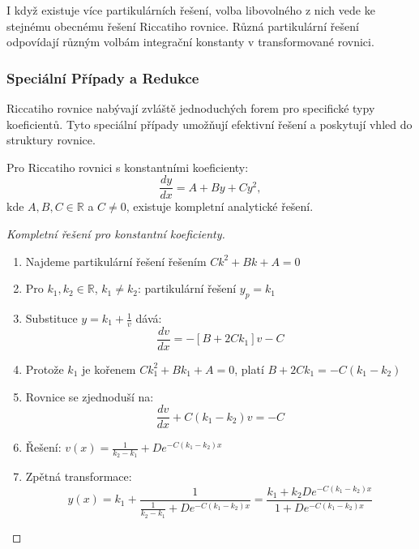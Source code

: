 \vspace{0.8\baselineskip}

\begin{remark}
\label{rem:volba-partikularniho}
I když existuje více partikulárních řešení, volba libovolného z nich vede ke stejnému 
obecnému řešení Riccatiho rovnice. Různá partikulární řešení odpovídají různým volbám 
integrační konstanty v transformované rovnici.
\end{remark}

\vspace{0.8\baselineskip}



\subsubsection{Speciální Případy a Redukce}
\label{subsubsec:specialni-pripady-riccati}

Riccatiho rovnice nabývají zvláště jednoduchých forem pro specifické typy koeficientů. Tyto speciální případy umožňují efektivní řešení a poskytují vhled do struktury rovnice.

\vspace{0.8\baselineskip}

\begin{method}
\label{met:l2-riccati-konstantni-koeficienty}
Pro Riccatiho rovnici s konstantními koeficienty:
\[
\frac{dy}{dx} = A + By + Cy^2,
\]
kde $A, B, C \in \mathbb{R}$ a $C \neq 0$, existuje kompletní analytické řešení.
\end{method}

\vspace{0.6\baselineskip}

\begin{proof}[Kompletní řešení pro konstantní koeficienty]
\begin{enumerate}
\item Najdeme partikulární řešení řešením $Ck^2 + Bk + A = 0$
\item Pro $k_1, k_2 \in \mathbb{R}$, $k_1 \neq k_2$: partikulární řešení $y_p = k_1$
\item Substituce $y = k_1 + \frac{1}{v}$ dává:
\[
\frac{dv}{dx} = -[B + 2Ck_1]v - C
\]
\item Protože $k_1$ je kořenem $Ck_1^2 + Bk_1 + A = 0$, platí $B + 2Ck_1 = -C(k_1 - k_2)$
\item Rovnice se zjednoduší na:
\[
\frac{dv}{dx} + C(k_1 - k_2)v = -C
\]
\item Řešení: $v(x) = \frac{1}{k_2 - k_1} + De^{-C(k_1 - k_2)x}$
\item Zpětná transformace:
\[
y(x) = k_1 + \frac{1}{\frac{1}{k_2 - k_1} + De^{-C(k_1 - k_2)x}}
= \frac{k_1 + k_2De^{-C(k_1 - k_2)x}}{1 + De^{-C(k_1 - k_2)x}}
\]
\end{enumerate}
\end{proof}

